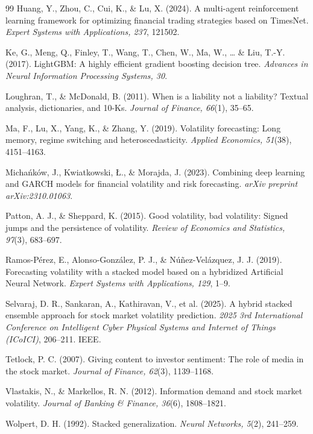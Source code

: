 \documentclass[review]{elsarticle}
\begin{document}
\begin{thebibliography}{99}
Huang, Y., Zhou, C., Cui, K., \& Lu, X. (2024). A multi-agent reinforcement learning framework for optimizing financial trading strategies based on TimesNet. \emph{Expert Systems with Applications, 237}, 121502.

Ke, G., Meng, Q., Finley, T., Wang, T., Chen, W., Ma, W., \ldots{} \& Liu, T.-Y. (2017). LightGBM: A highly efficient gradient boosting decision tree. \emph{Advances in Neural Information Processing Systems, 30}.

Loughran, T., \& McDonald, B. (2011). When is a liability not a liability? Textual analysis, dictionaries, and 10-Ks. \emph{Journal of Finance, 66}(1), 35--65.

Ma, F., Lu, X., Yang, K., \& Zhang, Y. (2019). Volatility forecasting: Long memory, regime switching and heteroscedasticity. \emph{Applied Economics, 51}(38), 4151--4163.

Micha\'{n}k\'{o}w, J., Kwiatkowski, \L., \& Morajda, J. (2023). Combining deep learning and GARCH models for financial volatility and risk forecasting. \emph{arXiv preprint arXiv:2310.01063}.

Patton, A. J., \& Sheppard, K. (2015). Good volatility, bad volatility: Signed jumps and the persistence of volatility. \emph{Review of Economics and Statistics, 97}(3), 683--697.

Ramos-P\'{e}rez, E., Alonso-Gonz\'{a}lez, P. J., \& N\'{u}\~{n}ez-Vel\'{a}zquez, J. J. (2019). Forecasting volatility with a stacked model based on a hybridized Artificial Neural Network. \emph{Expert Systems with Applications, 129}, 1--9.

Selvaraj, D. R., Sankaran, A., Kathiravan, V., et al. (2025). A hybrid stacked ensemble approach for stock market volatility prediction. \emph{2025 3rd International Conference on Intelligent Cyber Physical Systems and Internet of Things (ICoICI)}, 206--211. IEEE.

Tetlock, P. C. (2007). Giving content to investor sentiment: The role of media in the stock market. \emph{Journal of Finance, 62}(3), 1139--1168.

Vlastakis, N., \& Markellos, R. N. (2012). Information demand and stock market volatility. \emph{Journal of Banking \& Finance, 36}(6), 1808--1821.

Wolpert, D. H. (1992). Stacked generalization. \emph{Neural Networks, 5}(2), 241--259.

\end{thebibliography}
\end{document}
